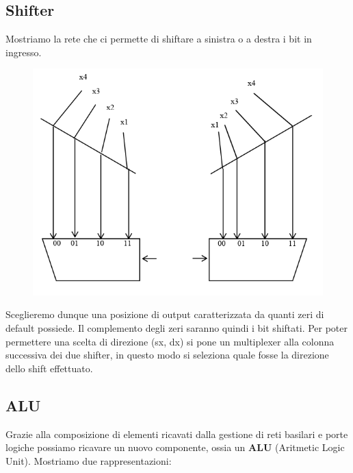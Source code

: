\documentclass{article}
\begin{document}
\subsection{Shifter} Mostriamo la rete che ci permette di shiftare a sinistra o a destra i bit in ingresso.

\begin{figure}[htbp]
    \center
    \includegraphics[scale=0.35]{img/shifter_sx_dx.png}
\end{figure}

\newpage

Sceglieremo dunque una posizione di output caratterizzata da quanti zeri di default possiede. Il complemento degli zeri saranno quindi i bit shiftati. Per poter permettere una scelta di direzione (sx, dx) si pone un multiplexer alla colonna successiva dei due shifter, in questo modo si seleziona quale fosse la direzione dello shift effettuato.

\subsection{ALU}

Grazie alla composizione di elementi ricavati dalla gestione di reti basilari e porte logiche possiamo ricavare un nuovo componente, ossia un \textbf{ALU} (Aritmetic Logic Unit). Mostriamo due rappresentazioni:
\end{document}
